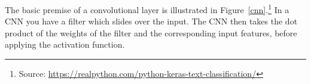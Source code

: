 The basic premise of a convolutional layer is illustrated in Figure~\ref{cnn}.\footnote{Source: \url{https://realpython.com/python-keras-text-classification/}} In a CNN you have a filter which slides over the input. The CNN then takes the dot product of the weights of the filter and the corresponding input features, before applying the activation function.

